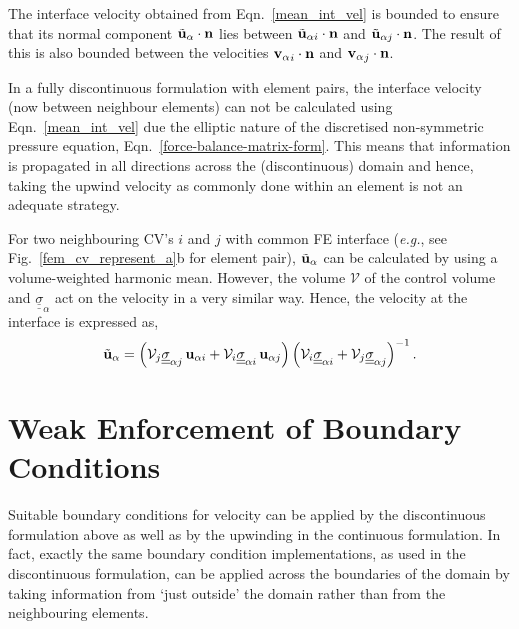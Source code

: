 The interface velocity obtained from Eqn.~\ref{mean_int_vel} is bounded to ensure that its normal component ${\tilde{\bf u}_\alpha}\cdot {\bf n}$ lies between ${\tilde{\bf u}_{\alpha i}}\cdot {\bf n}$ and ${\tilde{\bf u}_{\alpha j}}\cdot {\bf n}$. The result of this is also bounded between the velocities ${{\bf v}_\alpha}_i\cdot {\bf n}$ and ${{\bf v}_\alpha}_j\cdot {\bf n}$.

\medskip

In a fully discontinuous formulation with  element pairs, the interface velocity (now between neighbour elements) can not be calculated using Eqn.~\ref{mean_int_vel} due the elliptic nature of the discretised non-symmetric pressure equation, Eqn.~\ref{force-balance-matrix-form}. This means that information is propagated in all directions across the (discontinuous) domain and hence, taking the upwind velocity as commonly done within an element is not an adequate strategy.
 
For two neighbouring CV's $i$ and $j$ with common FE interface ({\it e.g.}, see Fig.~\ref{fem_cv_represent_a}b for  element pair), $\tilde{\bf u}_\alpha$ can be calculated by using a volume-weighted harmonic mean. However, the volume $\mathcal{V}$ of the control volume and $\underline{\underline{\sigma}}_{\alpha}$ act on the velocity in a very similar way. Hence, the velocity at the interface is expressed as,
\begin{equation} 
  {\tilde{\bf u}_\alpha} =  \left(\mathcal{V}_{j} \underline{\underline{\sigma}}_{\alpha j} \, {\bf u}_{\alpha i} + \mathcal{V}_{i} \underline{\underline{\sigma}}_{\alpha i}\, {\bf u}_{\alpha j} \right) \left(  \mathcal{V}_{i} \underline{\underline{\sigma}}_{\alpha i} + \mathcal{V}_{j}  \underline{\underline{\sigma}}_{\alpha j} \right)^{-1}.
\end{equation} 


\section{Weak Enforcement of Boundary Conditions}\label{ChapterMultiFluidsModel:Section:bcs-rel-perm} 
Suitable boundary conditions for velocity can be applied by the discontinuous formulation above as well as by the upwinding in the continuous formulation. In fact, exactly the same boundary condition implementations, as used in the discontinuous formulation, can be applied across the boundaries of the domain by taking information from `just outside' the domain rather than from the neighbouring elements.

